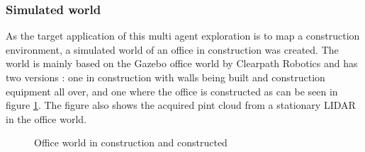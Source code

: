 \documentclass[12pt]{article}
\begin{document}
    \subsubsection{Simulated world}

    As the target application of this multi agent exploration is to map a construction environment, a simulated world of an office in construction was created. The world is mainly based on the Gazebo office world by Clearpath Robotics and has two versions : one in construction with walls being built and construction equipment all over, and one where the office is constructed as can be seen in figure \ref{fig:office_world}. The figure also shows the acquired pint cloud from a stationary LIDAR in the office world. 

    \begin{figure}[H]
        \centering
        \caption{Office world in construction and constructed}
        \label{fig:office_world}
    \end{figure}
\end{document}
